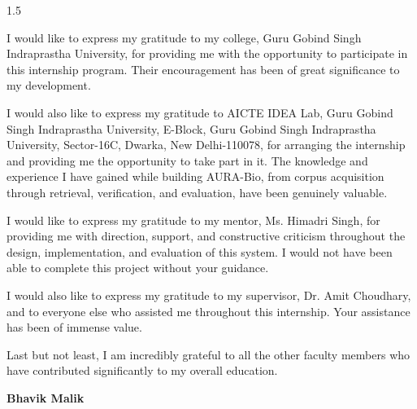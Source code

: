 \begin{spacing}{1.5}

I would like to express my gratitude to my college, Guru Gobind Singh Indraprastha University, for providing me with the opportunity to participate in this internship program. Their encouragement has been of great significance to my development.

I would also like to express my gratitude to AICTE IDEA Lab, Guru Gobind Singh Indraprastha University, E-Block, Guru Gobind Singh Indraprastha University, Sector-16C, Dwarka, New Delhi-110078, for arranging the internship and providing me the opportunity to take part in it. The knowledge and experience I have gained while building AURA-Bio, from corpus acquisition through retrieval, verification, and evaluation, have been genuinely valuable.

I would like to express my gratitude to my mentor, Ms. Himadri Singh, for providing me with direction, support, and constructive criticism throughout the design, implementation, and evaluation of this system. I would not have been able to complete this project without your guidance.

I would also like to express my gratitude to my supervisor, Dr. Amit Choudhary, and to everyone else who assisted me throughout this internship. Your assistance has been of immense value.

Last but not least, I am incredibly grateful to all the other faculty members who have contributed significantly to my overall education.
\vspace{3.5cm}\\


\begin{flushright}
\textbf{Bhavik Malik}\\
\end{flushright}
\end{spacing}
